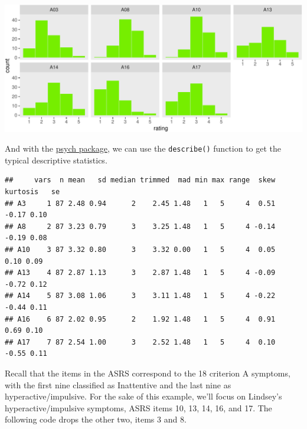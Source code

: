 \documentclass[]{article}
\newenvironment{Shaded}{\begin{snugshade}}{\end{snugshade}}
\newcommand{\KeywordTok}[1]{\textcolor[rgb]{0.13,0.29,0.53}{\textbf{#1}}}
\newcommand{\StringTok}[1]{\textcolor[rgb]{0.31,0.60,0.02}{#1}}
\newcommand{\OperatorTok}[1]{\textcolor[rgb]{0.81,0.36,0.00}{\textbf{#1}}}
\newcommand{\NormalTok}[1]{#1}
\begin{document}
\includegraphics{README_files/figure-latex/unnamed-chunk-3-1.pdf}

And with the
\href{https://cran.r-project.org/web/packages/psych/index.html}{psych
package}, we can use the \texttt{describe()} function to get the typical
descriptive statistics.

\begin{Shaded}
\end{Shaded}

\begin{verbatim}
##     vars  n mean   sd median trimmed  mad min max range  skew kurtosis   se
## A3     1 87 2.48 0.94      2    2.45 1.48   1   5     4  0.51    -0.17 0.10
## A8     2 87 3.23 0.79      3    3.25 1.48   1   5     4 -0.14    -0.19 0.08
## A10    3 87 3.32 0.80      3    3.32 0.00   1   5     4  0.05     0.10 0.09
## A13    4 87 2.87 1.13      3    2.87 1.48   1   5     4 -0.09    -0.72 0.12
## A14    5 87 3.08 1.06      3    3.11 1.48   1   5     4 -0.22    -0.44 0.11
## A16    6 87 2.02 0.95      2    1.92 1.48   1   5     4  0.91     0.69 0.10
## A17    7 87 2.54 1.00      3    2.52 1.48   1   5     4  0.10    -0.55 0.11
\end{verbatim}

Recall that the items in the ASRS correspond to the 18 criterion A
symptoms, with the first nine classified as Inattentive and the last
nine as hyperactive/impulsive. For the sake of this example, we'll focus
on Lindsey's hyperactive/impulsive symptoms, ASRS items 10, 13, 14, 16,
and 17. The following code drops the other two, items 3 and 8.
\end{document}

